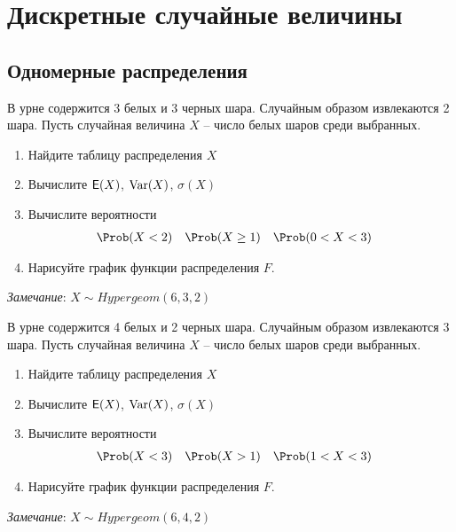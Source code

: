 

\section{Дискретные случайные величины}

\subsection{Одномерные распределения}

\begin{exercise}
В урне содержится 3 белых и 3 черных шара. Случайным образом извлекаются
2 шара. Пусть случайная величина \(X\) -- число белых шаров среди выбранных.
\begin{enumerate}
	\item Найдите таблицу распределения \(X\)
	\item Вычислите \({\mathsf E}(X)\), \(\operatorname{Var}(X)\), \(\sigma(X)\)
	\item Вычислите вероятности
	\begin{align*}
		&\Prob(X<2) & &\Prob(X\geq1) & &\Prob(0<X<3)
	\end{align*}
	\item Нарисуйте график функции распределения \(F\).
\end{enumerate}
\textit{Замечание}: \(X\sim Hypergeom(6,3,2)\)
\end{exercise}

\begin{exercise}
В урне содержится 4 белых и 2 черных шара. Случайным образом извлекаются
3 шара. Пусть случайная величина \(X\) -- число белых шаров среди выбранных.
\begin{enumerate}
	\item Найдите таблицу распределения \(X\)
	\item Вычислите \({\mathsf E}(X)\), \(\operatorname{Var}(X)\), \(\sigma(X)\)
	\item Вычислите вероятности
	\begin{align*}
		&\Prob(X<3) & &\Prob(X>1) & &\Prob(1<X<3)
	\end{align*}
	\item Нарисуйте график функции распределения \(F\).
\end{enumerate}
\textit{Замечание}: \(X\sim Hypergeom(6,4,2)\)
\end{exercise}

